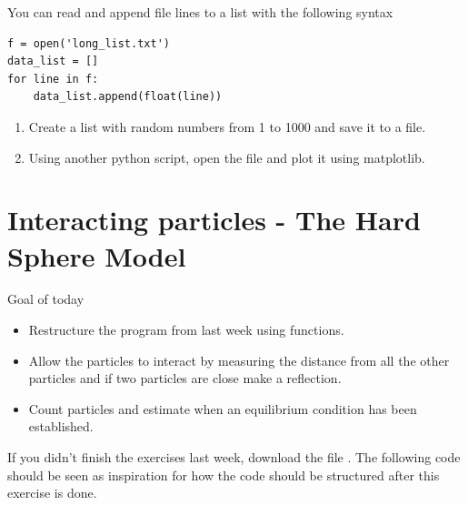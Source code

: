 \documentclass{article}
\begin{document}
You can read and append file lines to a list with the following syntax
\begin{lstlisting}
f = open('long_list.txt')
data_list = []
for line in f:
    data_list.append(float(line))
\end{lstlisting}

\begin{enumerate}[resume]

    \item Create a list with random numbers from 1 to 1000 and save it to a file.

    \item Using another python script, open the file and plot it using matplotlib.

\end{enumerate}


\newpage
\section{Interacting particles - The Hard Sphere Model}

Goal of today

\begin{itemize}
    \item Restructure the program from last week using functions.
    \item Allow the particles to interact by measuring the distance from all the other particles and if two particles are close make a reflection.
    \item Count particles and estimate when an equilibrium condition has been established.
\end{itemize}

If you didn't finish the exercises last week, download the file .
The following code should be seen as inspiration for how the code should be structured after this exercise is done.
\end{document}
